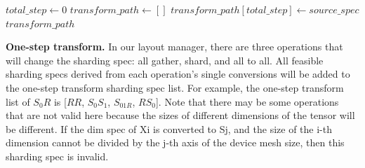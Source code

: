 

\begin{algorithm}[h]
\caption{An algorithm with caption}
\label{alg: layout conversion}
$total\_step \leftarrow 0$\;
$transform\_path \leftarrow []$\;
$transform\_path[total\_step] \leftarrow source\_spec$\;
\Return  $transform\_path$\;
\end{algorithm}

\noindent\textbf{One-step transform.} In our layout manager, there are three operations that will change the sharding spec: all gather, shard, and all to all. All feasible sharding specs derived from each operation's single conversions will be added to the one-step transform sharding spec list. For example, the one-step transform list of $S_0R$ is [$RR$, $S_0S_1$, $S_{01R}$, $RS_0$]. Note that there may be some operations that are not valid here because the sizes of different dimensions of the tensor will be different. If the dim spec of Xi is converted to Sj, and the size of the i-th dimension cannot be divided by the j-th axis of the device mesh size, then this sharding spec is invalid.

